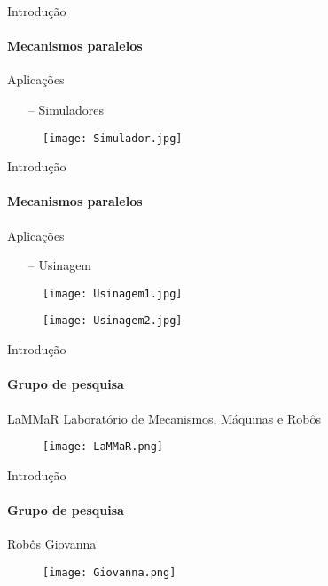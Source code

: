 \documentclass[25pt,landscape]{beamer}
\begin{document}
\begin{frame}{Introdução}
    \framesubtitle{Mecanismos paralelos}
    \begin{block}{Aplica\c{c}\~oes}
        \begin{itemize}
            \item[--] Simuladores
        \end{itemize}
    \end{block}
    \begin{figure}[!h]
        \centering
        \texttt{[image: Simulador.jpg]}
    \end{figure}  
\end{frame}

\begin{frame}{Introdução}
    \framesubtitle{Mecanismos paralelos}
    \begin{block}{Aplica\c{c}\~oes}
        \begin{itemize}
            \item[--] Usinagem
        \end{itemize}
    \end{block}
    \begin{multicols}{2}
    \begin{figure}[!h]
        \centering
        \texttt{[image: Usinagem1.jpg]}
    \end{figure}

    \begin{figure}[!h]
        \centering
        \texttt{[image: Usinagem2.jpg]}
    \end{figure}
    \end{multicols}
\end{frame}


\begin{frame}{Introdução}
	\framesubtitle{Grupo de pesquisa}
	\begin{block}{LaMMaR}
		Laborat\'orio de Mecanismos, M\'aquinas e Rob\^os
    \end{block}
    \begin{figure}[!h]
        \centering
        \texttt{[image: LaMMaR.png]}
    \end{figure}
\end{frame}

\begin{frame}{Introdução}
	\framesubtitle{Grupo de pesquisa}
	\begin{block}{Rob\^os}
		Giovanna
    \end{block}
    \begin{figure}[!h]
        \centering
        \texttt{[image: Giovanna.png]}
    \end{figure}
\end{frame}
\end{document}
